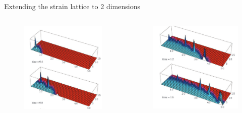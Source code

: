 \documentclass{beamer}
\begin{document}
\begin{frame}{Extending the strain lattice to 2 dimensions}
    \begin{columns}
        \begin{column}{0.5\textwidth}
            \begin{figure}
                \includegraphics[width=\textwidth]{gog_2d_fig/gog_2d_a.png}
            \end{figure}        
        \end{column}
        \begin{column}{0.5\textwidth}
            \begin{figure}
                \includegraphics[width=\textwidth]{gog_2d_fig/gog_2d_b.png}

\end{figure}
\end{column}
\end{columns}
\end{frame}
\end{document}
